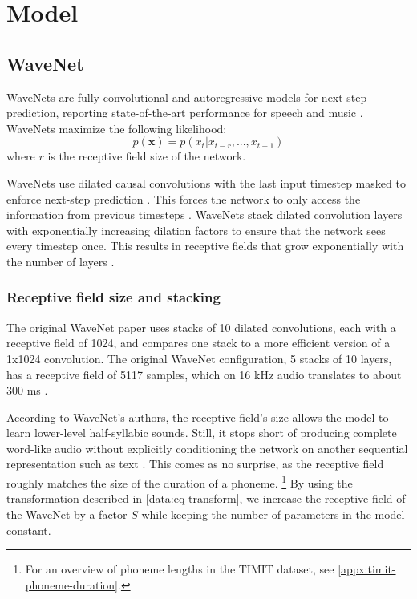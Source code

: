 
\section{Model}
\subsection{WaveNet}
WaveNets are fully convolutional and autoregressive models for next-step prediction, reporting state-of-the-art performance for speech and music \cite{oord_wavenet_2016}.
WaveNets maximize the following likelihood:
\[
p(\mathbf{x}) = p(x_t|x_{t-r}, ... , x_{t-1})
\]
where $r$ is the receptive field size of the network. 

WaveNets use dilated causal convolutions with the last input timestep masked to enforce next-step prediction \cite{dutilleux_implementation_1990}.
This forces the network to only access the information from previous timesteps \cite{oord_wavenet_2016}.
WaveNets stack dilated convolution layers with exponentially increasing dilation factors to ensure that the network sees every timestep once.
This results in receptive fields that grow exponentially with the number of layers \cite{yu_multi-scale_2016}.



\subsubsection{Receptive field size and stacking}
The original WaveNet paper uses stacks of 10 dilated convolutions, each with a receptive field of 1024, and compares one stack to a more efficient version of a 1x1024 convolution. 
The original WaveNet configuration, 5 stacks of 10 layers, has a receptive field of 5117 samples, which on 16 kHz audio translates to about 300 ms  
 \cite{oord_pixel_2016, oord_wavenet_2016}.

According to WaveNet's authors, the receptive field's size allows the model to learn lower-level half-syllabic sounds. 
Still, it stops short of producing complete word-like audio without explicitly conditioning the network on another sequential representation such as text \cite{oord_wavenet_2016}.
This comes as no surprise, as the receptive field roughly matches the size of the duration of a phoneme.
\footnote{
For an overview of phoneme lengths in the TIMIT dataset, see \cref{appx:timit-phoneme-duration}. }
By using the transformation described in \cref{data:eq-transform}, we increase the receptive field of the WaveNet by a factor $S$ while keeping the number of parameters in the model constant. 

